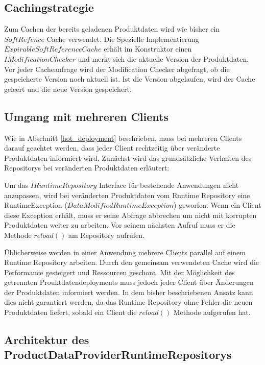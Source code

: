 \documentclass[headsepline=true, footsepline=true]{scrartcl}
\begin{document}
\subsection{Cachingstrategie}

Zum Cachen der bereits geladenen Produktdaten wird wie bisher ein $SoftRefence$
Cache verwendet. Die Spezielle Implementierung $ExpirableSoftReferenceCache$
erhält im Konstruktor einen $IModificationChecker$ und merkt sich die aktuelle
Version der Produktdaten. Vor jeder Cacheanfrage wird der
Modification Checker abgefragt, ob die gespeicherte Version noch aktuell ist.
Ist die Version abgelaufen, wird der Cache geleert und die neue Version
gespeichert.


\subsection{Umgang mit mehreren Clients}

Wie in Abschnitt \ref{hot_deployment} beschrieben, muss bei mehreren Clients
darauf geachtet werden, dass jeder Client rechtzeitig über veränderte
Produktdaten informiert wird. Zunächst wird das grundsätzliche
Verhalten des Repositorys bei veränderten Produktdaten erläutert:

Um das $IRuntimeRepository$ Interface für bestehende Anwendungen nicht
anzupassen, wird bei veränderten Produktdaten vom Runtime Repository eine
RuntimeException ($DataModifiedRuntimeException$) geworfen. Wenn ein Client diese
Exception erhält, muss er seine Abfrage abbrechen um nicht mit korrupten
Produktdaten weiter zu arbeiten. Vor seinem nächsten Aufruf muss er die Methode
$reload()$ am Repository aufrufen.

Üblicherweise werden in einer Anwendung mehrere Clients parallel auf einem
Runtime Repository arbeiten. Durch den gemeinsam verwendeten Cache wird die
Performance gesteigert und Ressourcen geschont. Mit der Möglichkeit des
getrennten Prouktdatendeployments muss jedoch jeder Client über Änderungen der
Produktdaten informiert werden. In dem bisher beschriebenen Ansatz kann dies
nicht garantiert werden, da das Runtime Repository ohne Fehler die neuen
Produktdaten liefert, sobald ein Client die $reload()$ Methode aufgerufen hat.






\subsection{Architektur des ProductDataProviderRuntimeRepositorys}
\end{document}
